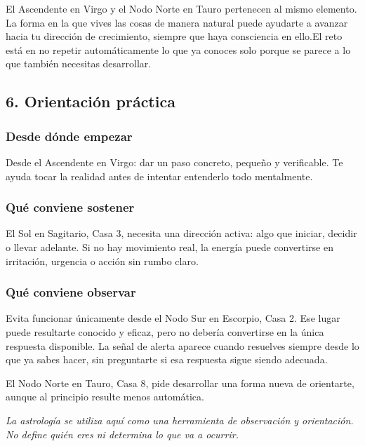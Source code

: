 \documentclass[11pt,a4paper]{article}
\begin{document}
El Ascendente en Virgo y el Nodo Norte en Tauro pertenecen al mismo elemento. La forma en la que vives las cosas de manera natural puede ayudarte a avanzar hacia tu dirección de crecimiento, siempre que haya consciencia en ello.El reto está en no repetir automáticamente lo que ya conoces solo porque se parece a lo que también necesitas desarrollar.

\vspace{0.6cm}

\subsection{6. Orientación práctica}

\subsubsection*{Desde dónde empezar}
Desde el Ascendente en Virgo: dar un paso concreto, pequeño y verificable. Te ayuda tocar la realidad antes de intentar entenderlo todo mentalmente.

\subsubsection*{Qué conviene sostener}
El Sol en Sagitario, Casa 3, necesita una dirección activa: algo que iniciar, decidir o llevar adelante. Si no hay movimiento real, la energía puede convertirse en irritación, urgencia o acción sin rumbo claro.

\subsubsection*{Qué conviene observar}
Evita funcionar únicamente desde el Nodo Sur en Escorpio, Casa 2. Ese lugar puede resultarte conocido y eficaz, pero no debería convertirse en la única respuesta disponible. La señal de alerta aparece cuando resuelves siempre desde lo que ya sabes hacer, sin preguntarte si esa respuesta sigue siendo adecuada.

El Nodo Norte en Tauro, Casa 8, pide desarrollar una forma nueva de orientarte, aunque al principio resulte menos automática.

\vspace{1cm}

\begin{center}
{\small\itshape\color{grisai}
La astrología se utiliza aquí como una herramienta de observación y orientación.
No define quién eres ni determina lo que va a ocurrir.
}
\end{center}
\end{document}
